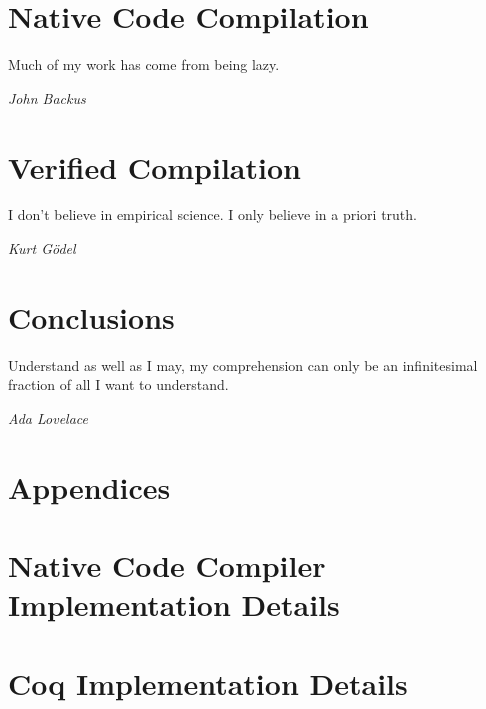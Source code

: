 \documentclass[botnum]{unmeethesis}
\begin{document}
\chapter{Native Code Compilation}\label{chap:cem}
\epigraph{Much of my work has come from being lazy.}{\textit{John Backus}}






\chapter{Verified Compilation}\label{chap:verified}
\epigraph{I don't believe in empirical science. I only believe in a priori
truth.}{\textit{Kurt Gödel}}









\chapter{Conclusions}\label{chap:conclusion}
\epigraph{Understand as well as I may, my comprehension can only be an
infinitesimal fraction of all I want to understand.}{\textit{Ada Lovelace}}


\chapter*{Appendices}

\appendix
\chapter{Native Code Compiler Implementation Details}\label{chap:cem_appendix}
 

\chapter{Coq Implementation Details}\label{chap:coq_appendix}
 



\end{document}
